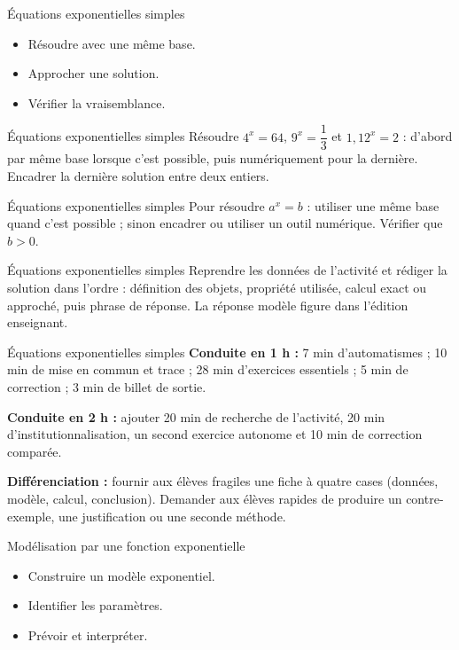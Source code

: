 \documentclass[aspectratio=169,10pt]{beamer}
\begin{document}
\begin{frame}{Équations exponentielles simples}
\begin{itemize}
\item Résoudre avec une même base.
\item Approcher une solution.
\item Vérifier la vraisemblance.

\end{itemize}
\end{frame}
\begin{frame}{Équations exponentielles simples}
Résoudre \(4^x=64\), \(9^x=\dfrac13\) et \(1{,}12^x=2\) : d'abord par même base lorsque c'est possible, puis numériquement pour la dernière. Encadrer la dernière solution entre deux entiers.
\end{frame}
\begin{frame}{Équations exponentielles simples}
Pour résoudre \(a^x=b\) : utiliser une même base quand c'est possible ; sinon encadrer ou utiliser un outil numérique. Vérifier que \(b>0\).
\end{frame}
\begin{frame}{Équations exponentielles simples}
Reprendre les données de l'activité et rédiger la solution dans l'ordre : définition des objets, propriété utilisée, calcul exact ou approché, puis phrase de réponse. La réponse modèle figure dans l'édition enseignant.
\end{frame}
\begin{frame}{Équations exponentielles simples}
\textbf{Conduite en 1 h :} 7 min d'automatismes ; 10 min de mise en commun et trace ; 28 min d'exercices essentiels ; 5 min de correction ; 3 min de billet de sortie.

\textbf{Conduite en 2 h :} ajouter 20 min de recherche de l'activité, 20 min d'institutionnalisation, un second exercice autonome et 10 min de correction comparée.

\textbf{Différenciation :} fournir aux élèves fragiles une fiche à quatre cases (données, modèle, calcul, conclusion). Demander aux élèves rapides de produire un contre-exemple, une justification ou une seconde méthode.
\end{frame}
\begin{frame}{Modélisation par une fonction exponentielle}
\begin{itemize}
\item Construire un modèle exponentiel.
\item Identifier les paramètres.
\item Prévoir et interpréter.

\end{itemize}
\end{frame}
\end{document}
